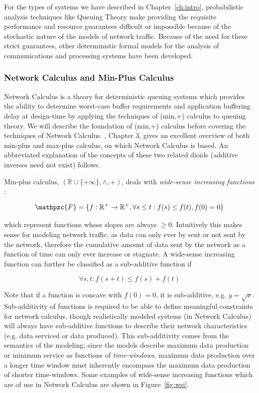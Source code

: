 For the types of systems we have described in Chapter~\ref{ch:intro},
probabilistic analysis techniques like Queuing Theory make providing
the requisite performance and resource guarantees difficult or
impossible because of the stochastic nature of the models of network
traffic\cite{NC_Cruz1991}.  Because of the need for these strict
guarantees, other deterministic formal models for the analysis of
communications and processing systems have been developed.

\subsubsection{Network Calculus and Min-Plus Calculus}
Network Calculus\cite{NC_Cruz1991}\cite{NC_Cruz1991a}\cite{NCBook} is
a theory for deterministic queuing systems which provides the ability
to determine worst-case buffer requirements and application buffering
delay at design-time by applying the techniques of (min,+) calculus to
queuing theory.  We will describe the foundation of (min,+) calculus
before covering the techniques of Network Calculus. \cite{NCBook},
Chapter 3, gives an excellent overview of both min-plus and max-plus
calculus, on which Network Calculus is based.  An abbreviated
explanation of the concepts of these two related dioids (additive
inverses need not exist) follows.

Min-plus calculus, $(\mathbb{R}\cup\{+\infty\},\wedge,+)$, deals with
\textit{wide-sense increasing functions} :

\begin{equation}
  \mathpzc{F}=\{f : \mathbb{R}^+ \rightarrow \mathbb{R}^+, \forall s
  \leq t : f(s) \leq f(t), f(0) = 0\}
\end{equation}

which represent functions whose slopes are always $\geq 0$.
Intuitively this makes sense for modeling network traffic, as data can
only ever by sent or not sent by the network, therefore the cumulative
amount of data sent by the network as a function of time can only ever
increase or stagnate.  A wide-sense increasing function can further be
classified as a sub-additive function if

\begin{equation}
  \forall s,t : f(s+t) \leq f(s) + f(t)
\end{equation}

Note that if a function is concave with $f(0)=0$, it is sub-additive,
e.g. $y=\sqrt{x}$.  Sub-additivity of functions is required to be able
to define meaningful constraints for network calculus, though
realistically modeled systems (in Network Calculus) will always have
sub-additive functions to describe their network characteristics
(e.g. data serviced or data produced).  This sub-additivity comes from
the semantics of the modeling; since the models describe maximum data
production or minimum service as functions of \emph{time-windows},
maximum data production over a longer time window must inherently
encompass the maximum data production of shorter time-windows.  Some
examples of wide-sense increasing functions which are of use in
Network Calculus are shown in Figure~\ref{fig:wsi}.

